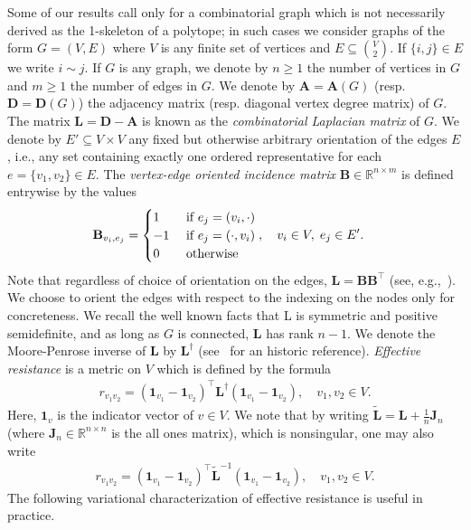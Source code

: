 \documentclass[11pt,a4paper]{amsart}
\begin{document}
Some of our results call only for a combinatorial graph which is not necessarily derived as the 1-skeleton of a polytope; in such cases we consider graphs of the form $G=(V, E)$ where $V$ is any finite set of vertices and $E\subseteq \binom{V}{2}$. If $\{i, j\}\in E$ we write $i\sim j$. If $G$ is any graph, we denote by $n\geq 1$ the number of vertices in $G$ and $m\geq 1$ the number of edges in $G$. We denote by $\mathbf{A}=\mathbf{A}(G)$ (resp. $\mathbf{D}=\mathbf{D}(G)$) the adjacency matrix (resp. diagonal vertex degree matrix) of $G$. The matrix $\mathbf{L}=\mathbf{D}-\mathbf{A}$ is known as the \emph{combinatorial Laplacian matrix} of $G$. We denote by $E'\subseteq V\times V$ any fixed but otherwise arbitrary orientation of the edges $E$, i.e., any set containing exactly one ordered representative for each $e=\{v_1, v_2\}\in E$. The \emph{vertex-edge oriented incidence matrix} $\mathbf{B}\in\mathbb{R}^{n\times m}$ is defined entrywise by the values
    \begin{align}\label{eq:defn-incidence}
        \mathbf{B}_{v_i, e_j} &= \begin{cases}
            1 &\text{ if }e_j = (v_i, \cdot)\\
            -1&\text{ if }e_j = (\cdot, v_i)\\
            0&\text{ otherwise}
        \end{cases},\quad v_i\in V, \hspace{.1cm}e_j\in E'.
    \end{align}
Note that regardless of choice of orientation on the edges, $\mathbf{L} = \mathbf{B}\mathbf{B}^\top$ (see, e.g.,~\cite{chung1997spectral}). We choose to orient the edges with respect to the indexing on the nodes only for concreteness. We recall the well known facts that L is symmetric and positive semidefinite, and as long as $G$ is connected, $\mathbf{L}$ has rank $n-1$. We denote the Moore-Penrose inverse of $\mathbf{L}$ by $\mathbf{L}^\dagger$ (see~\cite{moore1920reciprocal} for an historic reference). \emph{Effective resistance} is a metric on $V$ which is defined by the formula
    \begin{align}
        r_{v_1 v_2} = (\mathbf{1}_{v_1} - \mathbf{1}_{v_2})^\top \mathbf{L}^\dagger (\mathbf{1}_{v_1} - \mathbf{1}_{v_2}), \quad v_1, v_2\in V.
    \end{align}
Here, $\mathbf{1}_{v}$ is the indicator vector of $v\in V$. We note that by writing $\widetilde{\mathbf{L}} = \mathbf{L} + \frac{1}{n}\mathbf{J}_n$ (where $\mathbf{J}_n\in\mathbb{R}^{n\times n}$ is the all ones matrix), which is nonsingular, one may also write	
    \begin{align}
        r_{v_1 v_2} = (\mathbf{1}_{v_1} - \mathbf{1}_{v_2})^\top \widetilde{\mathbf{L}}^{-1} (\mathbf{1}_{v_1} - \mathbf{1}_{v_2}), \quad v_1, v_2\in V.
    \end{align}
The following variational characterization of effective resistance is useful in practice.
\end{document}
